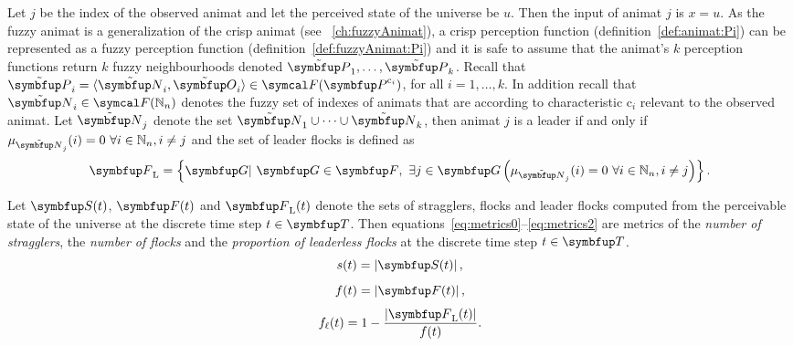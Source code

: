 Let $j$ be the index of the observed animat and let the perceived state of the universe be $u$. Then the input of animat $j$ is $x=u$.
As the fuzzy animat is a generalization of the crisp animat (see \chaptername~\ref{ch:fuzzyAnimat}), a crisp perception function (definition~\ref{def:animat:Pi}) can be represented as a fuzzy perception function (definition~\ref{def:fuzzyAnimat:Pi}) and it is safe to assume that the animat's $k$ perception functions return $k$ fuzzy neighbourhoods denoted $\fset{P}_1,\ldots,\fset{P}_k$. Recall that $\fset{P}_i=\langle\fset{N}_i,\fset{O}_i\rangle \in \fpowset{\set{P}^{\mathrm{c}_i}}$, for all $i=1,\ldots,k$. In addition recall that $\fset{N}_i \in \fpowset{\N_n}$ denotes the fuzzy set of indexes of animats that are according to characteristic $\mathrm{c}_i$ relevant to the observed animat. Let $\fset{N}_j$ denote the set $\fset{N}_1 \cup \cdots \cup \fset{N}_k$, then animat $j$ is a leader if and only if $\mu_{\fset{N}_j}(i)=0\ \forall i \in \N_n, i \neq j$ and the set of leader flocks is defined as
%
\begin{equation}
  \set{F}_\textnormal{L}=\left\{ \set{G}|\ \set{G} \in \set{F},\ \exists j \in \set{G}\left(\mu_{\fset{N}_j}(i)=0\ \forall i \in \N_n, i \neq j\right) \right\}. \label{eq:metric:FL}
\end{equation}

\begin{definition}
  \label{def:metrics}
  Let $\set{S}(t)$, $\set{F}(t)$ and $\set{F}_\textnormal{L}(t)$ denote the sets of stragglers, flocks and leader flocks computed from the perceivable state of the universe at the discrete time step $t \in \set{T}$. Then equations~\eqref{eq:metrics0}--\eqref{eq:metrics2} are metrics of the \emph{number of stragglers}, the \emph{number of flocks} and the \emph{proportion of leaderless flocks} at the discrete time step $t \in \set{T}$.
  \begin{equation}
    s(t)=\left|\set{S}(t)\right|, \label{eq:metrics0}
  \end{equation}
  \vspace*{-6mm}
  \begin{equation}
    f(t)=\left|\set{F}(t)\right|,
  \end{equation}
  \vspace*{-2mm}
  \begin{equation}
    f_\ell(t)=1-\frac{\left|\set{F}_\textnormal{L}(t)\right|}{f(t)}. \label{eq:metrics2}
  \end{equation}
\end{definition}

